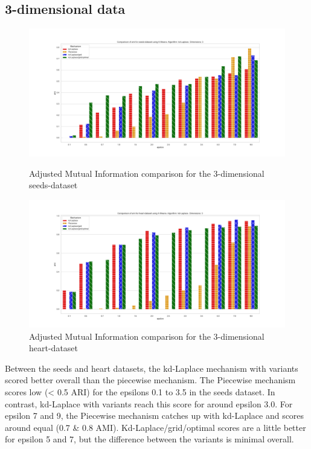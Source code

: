 \newpage
\subsection{3-dimensional data}
\begin{figure}[H]
    \centering
    \begin{minipage}[c]{0.8\textwidth}
        \includegraphics[width=1\textwidth]{Results/RQ2/seeds-dataset/ami_seeds-dataset_comparison.png}
        \caption{Adjusted Mutual Information comparison for the 3-dimensional seeds-dataset}
        \label{fig:ami_seeds-dataset_comparison_3d}
    \end{minipage}
    \begin{minipage}[c]{0.8\textwidth}
        \includegraphics[width=1\textwidth]{Results/RQ2/heart-dataset/ami_heart-dataset_comparison.png}
        \caption{Adjusted Mutual Information comparison for the 3-dimensional heart-dataset}
        \label{fig:ami_heart-dataset_comparison_3d}
    \end{minipage}

\end{figure}
Between the seeds and heart datasets, the kd-Laplace mechanism with variants scored better overall than the piecewise mechanism.
The Piecewise mechanism scores low (< 0.5 ARI) for the epsilons 0.1 to 3.5 in the seeds dataset.
In contrast, kd-Laplace with variants reach this score for around epsilon 3.0.
For epsilon 7 and 9, the Piecewise mechanism catches up with kd-Laplace and scores around equal (0.7 \& 0.8 AMI).
Kd-Laplace/grid/optimal scores are a little better for epsilon 5 and 7, but the difference between the variants is minimal overall.

